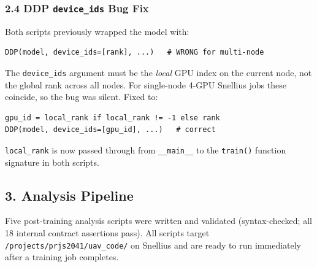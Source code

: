 \subsubsection*{2.4 DDP \texttt{device\_ids} Bug Fix}

Both scripts previously wrapped the model with:
\begin{verbatim}
DDP(model, device_ids=[rank], ...)   # WRONG for multi-node
\end{verbatim}
The \texttt{device\_ids} argument must be the \emph{local} GPU
index on the current node, not the global rank across all nodes.
For single-node 4-GPU Snellius jobs these coincide, so the bug
was silent. Fixed to:
\begin{verbatim}
gpu_id = local_rank if local_rank != -1 else rank
DDP(model, device_ids=[gpu_id], ...)   # correct
\end{verbatim}
\texttt{local\_rank} is now passed through from \texttt{\_\_main\_\_}
to the \texttt{train()} function signature in both scripts.

\subsection*{3. Analysis Pipeline}

Five post-training analysis scripts were written and validated
(syntax-checked; all 18 internal contract assertions pass).
All scripts target \texttt{/projects/prjs2041/uav\_code/} on
Snellius and are ready to run immediately after a training job
completes.

